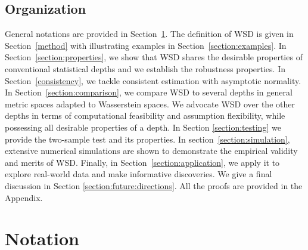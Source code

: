 \documentclass{imsart}
\numberwithin{equation}{section}
\begin{document}
\subsection{Organization}
General notations are provided in Section~\ref{section:notation}.
The definition of WSD is given in Section~\ref{method} with illustrating examples in Section~\ref{section:examples}. In Section~\ref{section:properties}, we show that WSD shares the desirable properties of conventional statistical depths \citep{zuo2000general} and we establish the robustness properties. 
In Section~\ref{consistency}, we tackle consistent estimation with asymptotic normality.
In Section~\ref{section:comparison}, we compare WSD to several depths in general metric spaces \citep{Geenens2023, LopezTukeyMetric, virta2023spatial} adapted to Wasserstein spaces.  
We advocate WSD over the other depths in terms of computational feasibility and assumption flexibility, while possessing all desirable properties of a depth. 
In Section \ref{section:testing} we provide the two-sample test and its properties.
In section~\ref{section:simulation}, extensive numerical simulations are shown to demonstrate the empirical validity and merits of WSD. 
Finally, in Section~\ref{section:application}, we apply it to explore real-world data and make informative discoveries. 
We give a final discussion in Section \ref{section:future:directions}.
All the proofs are provided in the Appendix.









\section{Notation} 
\label{section:notation}
\end{document}
